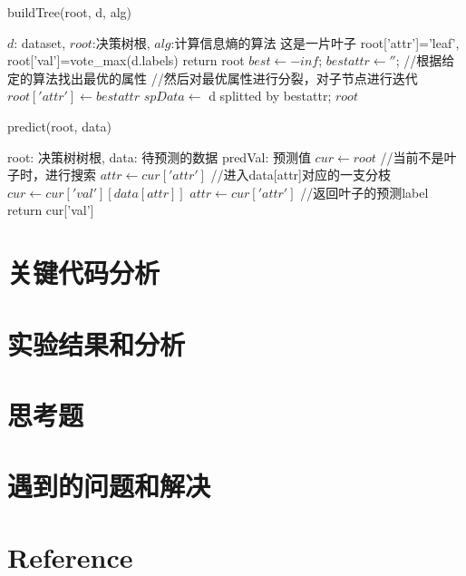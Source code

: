 \documentclass[11pt]{article}
\begin{document}
\begin{CJK}{UTF8}{gbsn}
\begin{algorithm}
\caption{buildTree(root, d, alg)}\label{alg6}
\begin{algorithmic}
\REQUIRE $d$: dataset, $root$:决策树根, $alg$:计算信息熵的算法
\STATE 这是一片叶子
\STATE root['attr']='leaf', root['val']=vote\_max(d.labels)
\STATE return root
\ELSE
\STATE $best \gets -inf$;
\STATE $bestattr \gets ''$;
\STATE //根据给定的算法找出最优的属性
\ENDFOR \newline
\STATE //然后对最优属性进行分裂，对子节点进行迭代
\STATE $root['attr']\gets bestattr$
\STATE $spData \gets$ d splitted by bestattr;
\ENDFOR 
\ENDIF
\ENSURE $root$

\end{algorithmic}
\end{algorithm}

\begin{algorithm}
\begin{algorithmic}
\caption{predict(root, data)}
\REQUIRE root:  决策树树根, data: 待预测的数据
\ENSURE predVal: 预测值
\STATE $cur \gets root$
\STATE //当前不是叶子时，进行搜索
\STATE $attr \gets cur['attr']$
\STATE //进入data[attr]对应的一支分枝
\STATE	$cur \gets cur['val'][data[attr]]$
\STATE  $attr \gets cur['attr']$
\ENDWHILE
\STATE //返回叶子的预测label
\STATE return cur['val']
\end{algorithmic}
\end{algorithm}

\section{关键代码分析}
\section{实验结果和分析}
\section{思考题}
\section{遇到的问题和解决}
\section{Reference}


\end{CJK}
\end{document}

